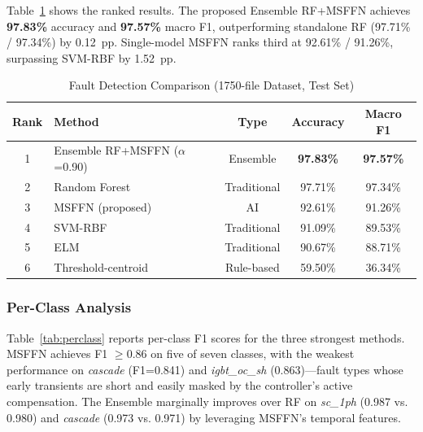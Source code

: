 Table~\ref{tab:detection} shows the ranked results.
The proposed Ensemble RF+MSFFN achieves
\textbf{97.83\%} accuracy and \textbf{97.57\%} macro F1,
outperforming standalone RF (97.71\% / 97.34\%) by 0.12~pp.
Single-model MSFFN ranks third at 92.61\% / 91.26\%,
surpassing SVM-RBF by 1.52~pp.

\begin{table}[htbp]
\caption{Fault Detection Comparison (1750-file Dataset, Test Set)}
\label{tab:detection}
\centering
\begin{tabular}{clccc}
\hline
Rank & Method & Type & Accuracy & Macro F1 \\
\hline
1 & Ensemble RF+MSFFN ($\alpha$=0.90) & Ensemble  & \textbf{97.83\%} & \textbf{97.57\%} \\
2 & Random Forest                      & Traditional & 97.71\% & 97.34\% \\
3 & MSFFN (proposed)                   & AI          & 92.61\% & 91.26\% \\
4 & SVM-RBF                            & Traditional & 91.09\% & 89.53\% \\
5 & ELM                                & Traditional & 90.67\% & 88.71\% \\
6 & Threshold-centroid                 & Rule-based  & 59.50\% & 36.34\% \\
\hline
\end{tabular}
\end{table}

\subsubsection{Per-Class Analysis}

Table~\ref{tab:perclass} reports per-class F1 scores for the
three strongest methods.
MSFFN achieves F1 $\geq 0.86$ on five of seven classes,
with the weakest performance on \textit{cascade} (F1=0.841)
and \textit{igbt\_oc\_sh} (0.863)—fault types whose early
transients are short and easily masked by the controller's
active compensation.
The Ensemble marginally improves over RF on
\textit{sc\_1ph} (0.987 vs. 0.980) and \textit{cascade}
(0.973 vs. 0.971) by leveraging MSFFN's temporal features.

